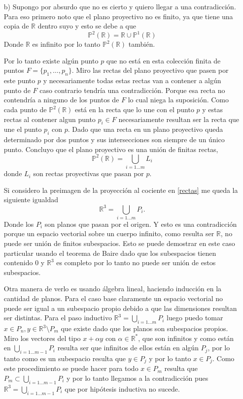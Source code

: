 \documentclass{article}
\newcommand{\R}{\mathbb R}
\newcommand{\PProy}{\mathbb P ^2 (\mathbb R)}
\newcommand{\RProy}{\mathbb P ^1 (\mathbb R)}
\begin{document}
\begin{itemize}
\begin{itemize}
	
	\item[b)] Supongo por absurdo que no es cierto y quiero llegar a una contradicción. Para eso primero noto que el plano proyectivo no es finito, ya que tiene una copia de $\R$ dentro suyo y esto se debe a que 
	\[ \PProy = \R \cup \RProy \]
	Donde $\R$ es infinito por lo tanto $\PProy$ también.
	
	Por lo tanto existe algún punto $p$ que no está en esta colección finita de puntos $F=\{p_1, \dots, p_n\}$. Miro las rectas del plano proyectivo que pasen por este punto $p$ y necesariamente todas estas rectas van a contener a algún punto de $F$ caso contrario tendría una contradicción.  Porque esa recta no contendría a ninguno de los puntos de $F$ lo cual niega la suposición. Como cada punto de $\PProy$ está en la recta que lo une con el punto $p$ y estas rectas al contener algun punto  $p_i \in F$ necesariamente resultan ser la recta que une el punto $p_i$ con $p$. Dado que una recta en un plano proyectivo queda determinado por dos puntos y sus intersecciones son siempre de un único punto. Concluyo que el plano proyectivo es una unión de finitas rectas,
	\begin{equation} \label{rectas}
	 \PProy = \bigcup_{i=1 \dots m} L_i 
	\end{equation} 
	donde $L_i$ son rectas proyectivas que pasan por $p$.
	
	Si considero la preimagen de la proyección al cociente en \ref{rectas} me queda la siguiente igualdad
	\begin{equation*}
	\R ^3 = \bigcup_{i=1 \dots m} P_i.
	\end{equation*}
	Donde los $P_i$ son planos que pasan por el origen. Y esto es una contradicción porque un espacio vectorial sobre un cuerpo infinito, como resulta ser $\R$, no puede ser unión de finitos subespacios. Esto se puede demostrar en este caso particular usando el teorema de Baire dado que los subespacios tienen contenido $0$ y $\mathbb R^3$ es completo por lo tanto no puede ser unión de estos subespacios.
	
	{\small Otra manera de verlo es usando álgebra lineal, haciendo inducción en la cantidad de planos. Para el caso base claramente un espacio vectorial no puede ser igual a un subespacio propio debido a que las dimensiones resultan ser distintas. Para el paso inductivo  $\R ^3 = \bigcup_{i=1 \dots m} P_i$ luego puedo tomar $x \in P_n, y \in \R^3 \setminus P_m$ que existe dado que los planos son subespacios propios. Miro los vectores del tipo $x +\alpha y$ con $\alpha \in \R^{*}$, que son infinitos y como están en $\bigcup_{i=1 \dots m-1} P_i$ resulta ser que infinitos de ellos están en algún $P_j$, por lo tanto como es un subespacio resulta que $y \in P_j$ y por lo tanto $x \in P_j$. Como este procedimiento se puede hacer para todo $x \in P_m$ resulta que $P_m \subset \bigcup_{i=1 \dots m-1} P_i$ y por lo tanto llegamos a la contradicción pues $\R^3 = \bigcup_{i=1 \dots m-1} P_i$ que por hipótesis inductiva no sucede.}
\end{itemize}


\end{itemize}
\end{document}

